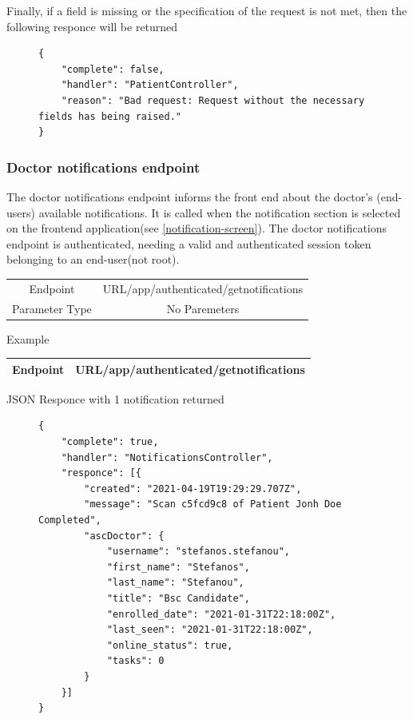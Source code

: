 					Finally, if a field is missing or the specification of the request is not met, then the following responce will be returned
					\begin{figure}[H]
						\iftrue
						\begin{lstlisting}[]
{
	"complete": false,
	"handler": "PatientController",
	"reason": "Bad request: Request without the necessary fields has being raised."
}					
						\end{lstlisting}
					\end{figure}
				\subsubsection{Doctor notifications endpoint}
					\label{get-notification}
					The doctor notifications endpoint informs the front end about the doctor's (end-users) available notifications.  
					It is called when the notification section is selected on the frontend application(see \ref{notification-screen}).  
					The doctor notifications endpoint is authenticated, needing a valid and authenticated session token belonging to an 
					end-user(not root).
					\begin{center}
						\begin{tabular}{ |c|c| } 
							\hline
							Endpoint & {{URL}}/app/authenticated/getnotifications\\
							Parameter Type & No Paremeters  \\
							\hline
						\end{tabular}
					\end{center}
					Example
					\begin{center}
						\begin{tabular}{ |c|c| } 
							\hline
							Endpoint & {{URL}}/app/authenticated/getnotifications\\
							\hline
						\end{tabular}
					\end{center}
					JSON Responce with 1 notification returned
					\begin{figure}[H]
						\iftrue
						\begin{lstlisting}[]
{
	"complete": true,
	"handler": "NotificationsController",
	"responce": [{
		"created": "2021-04-19T19:29:29.707Z",
		"message": "Scan c5fcd9c8 of Patient Jonh Doe Completed",
		"ascDoctor": {
			"username": "stefanos.stefanou",
			"first_name": "Stefanos",
			"last_name": "Stefanou",
			"title": "Bsc Candidate",
			"enrolled_date": "2021-01-31T22:18:00Z",
			"last_seen": "2021-01-31T22:18:00Z",
			"online_status": true,
			"tasks": 0
		}
	}]
}
						\end{lstlisting}
					\end{figure}
